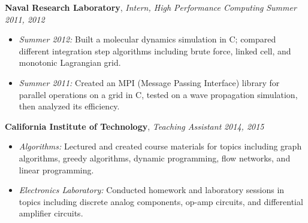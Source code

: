 \documentclass{article}
\newenvironment{changemargin}[2]{%
  \begin{list}{}{%
    \setlength{\topsep}{0pt}%
    \setlength{\leftmargin}{#1}%
    \setlength{\rightmargin}{#2}%
    \setlength{\listparindent}{\parindent}%
    \setlength{\itemindent}{\parindent}%
    \setlength{\parsep}{\parskip}%
  }%
  \item[]}{\end{list}
}
\newenvironment{body} {
	\vspace*{-16pt}
	\begin{changemargin}{-0.25in}{-0.5in}
  }	
	{\end{changemargin}
}
\newcommand{\CC}{C\nolinebreak\hspace{-.05em}\raisebox{.4ex}{\tiny\bf +}\nolinebreak\hspace{-.10em}\raisebox{.4ex}{\tiny\bf +}}
\begin{document}
\begin{body}
	\textbf{Naval Research Laboratory}, \emph{Intern, High Performance Computing} \hfill \emph{Summer 2011, 2012}\\
	\vspace*{-4pt}
	\begin{itemize}
		\item \emph{Summer 2012:} Built a molecular dynamics simulation in C; compared different integration step algorithms including brute force, linked cell, and monotonic Lagrangian grid.
		\item \emph{Summer 2011:} Created an MPI (Message Passing Interface) library for parallel operations on a grid in \CC, tested on a wave propagation simulation, then analyzed its efficiency.
	\end{itemize}

	\smallskip

	\textbf{California Institute of Technology}, \emph{Teaching Assistant} \hfill \emph{2014, 2015} \\
	\vspace*{-4pt}
	\begin{itemize}
		\item \emph{Algorithms:} Lectured and created course materials for topics including graph algorithms, greedy algorithms, dynamic programming, flow networks, and linear programming.
		\item \emph{Electronics Laboratory:} Conducted homework and laboratory sessions in topics including discrete analog components, op-amp circuits, and differential amplifier circuits.
	\end{itemize}
\end{body}

\smallskip
\end{document}
